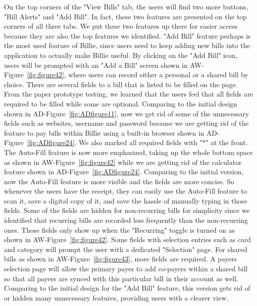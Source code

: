 \documentclass{sigchi}
\begin{document}
On the top corners of the "View Bills" tab, the users will find two more buttons, "Bill Alerts" and "Add Bill". In fact, these two features are presented on the top corners of all three tabs. We put these two features up there for easier access because they are also the top features we identified. "Add Bill" feature perhaps is the most used feature of Billie, since users need to keep adding new bills into the application to actually make Billie useful. By clicking on the "Add Bill" icon, users will be prompted with an "Add a Bill" screen shown in AW-Figure~\ref{fig:figure42}, where users can record either a personal or a shared bill by choice. There are several fields to a bill that is listed to be filled on the page. From the paper prototype testing, we learned that the users feel that all fields are required to be filled while some are optional. Comparing to the initial design shown in AD-Figure~\ref{fig:ADfigure11}, now we get rid of some of the unnecessary fields such as websites, username and password because we are getting rid of the feature to pay bills within Billie using a built-in browser shown in AD-Figure~\ref{fig:ADfigure24}. We also marked all required fields with "*" at the front. The Auto-Fill feature is now more emphasized, taking up the whole bottom space as shown in AW-Figure~\ref{fig:figure42} while we are getting rid of the calculator feature shown in AD-Figure~\ref{fig:ADfigure24}. Comparing to the initial version, now the Auto-Fill feature is more visible and the fields are more concise. So whenever the users have the receipt, they can easily use the Auto-Fill feature to scan it, save a digital copy of it, and save the hassle of manually typing in those fields. Some of the fields are hidden for non-recurring bills for simplicity since we identified that recurring bills are recorded less frequently than the non-recurring ones. Those fields only show up when the "Recurring" toggle is turned on as shown in AW-Figure~\ref{fig:figure42}. Some fields with selection entries such as card and category will prompt the user with a dedicated "Selection" page. For shared bills as shown in AW-Figure~\ref{fig:figure43}, more fields are required. A payers selection page will allow the primary payer to add co-payers within a shared bill so that all payers are synced with this particular bill in their account as well. Comparing to the initial design for the "Add Bill" feature, this version gets rid of or hidden many unnecessary features, providing users with a clearer view.
\end{document}
